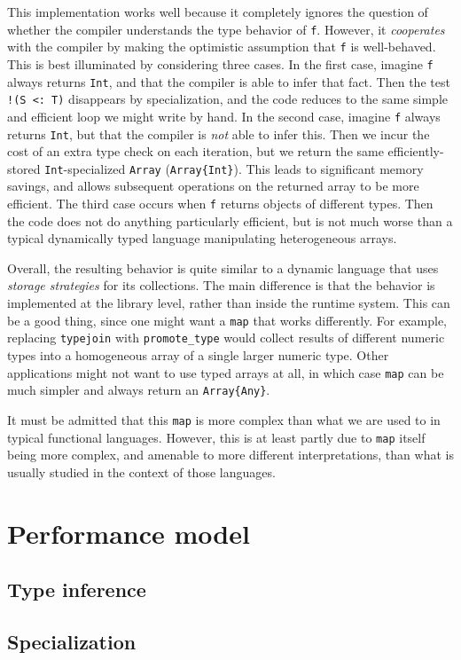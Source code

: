 This implementation works well because it completely ignores the
question of whether the compiler understands the type behavior of
\texttt{f}.
However, it \emph{cooperates} with the compiler by making the
optimistic assumption that \texttt{f} is well-behaved.
This is best illuminated by considering three cases.
In the first case, imagine \texttt{f} always returns \texttt{Int},
and that the compiler is able to infer that fact.
Then the test \texttt{!(S <: T)} disappears by specialization,
and the code reduces to the same simple and efficient loop we
might write by hand.
In the second case, imagine \texttt{f} always returns \texttt{Int},
but that the compiler is \emph{not} able to infer this.
Then we incur the cost of an extra type check on each iteration,
but we return the same efficiently-stored \texttt{Int}-specialized
\texttt{Array} (\texttt{Array\{Int\}}).
This leads to significant memory savings, and allows subsequent
operations on the returned array to be more efficient.
The third case occurs when \texttt{f} returns objects of different
types.
Then the code does not do anything particularly efficient, but is
not much worse than a typical dynamically typed language manipulating
heterogeneous arrays.

Overall, the resulting behavior is quite similar to a dynamic
language that uses \emph{storage strategies} \cite{Bolz2013} for its
collections.
The main difference is that the behavior is implemented at the
library level, rather than inside the runtime system.
This can be a good thing, since one might want a \texttt{map} that
works differently.
For example, replacing \texttt{typejoin} with \texttt{promote\_type}
would collect results of different numeric types into a
homogeneous array of a single larger numeric type.
Other applications might not want to use typed arrays at all, in
which case \texttt{map} can be much simpler and always return an
\texttt{Array\{Any\}}.

It must be admitted that this \texttt{map} is more complex than
what we are used to in typical functional languages.
However, this is at least partly due to \texttt{map} itself
being more complex, and amenable to more different interpretations,
than what is usually studied in the context of those languages.



\section{Performance model}

\subsection{Type inference}

\subsection{Specialization}


